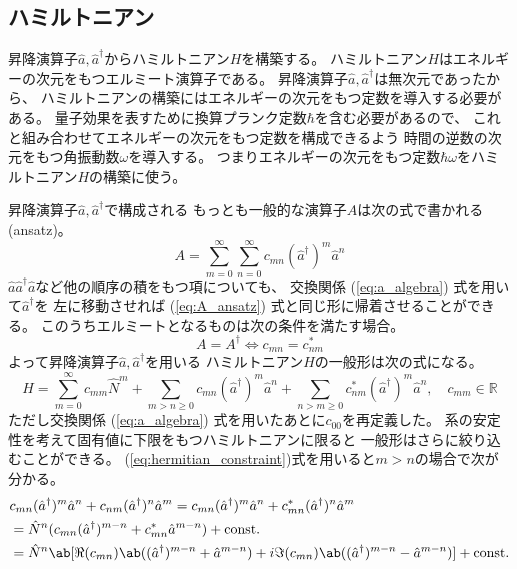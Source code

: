 
\subsection{ハミルトニアン}

昇降演算子$\hat{a},\hat{a}^\dagger$からハミルトニアン$H$を構築する。
ハミルトニアン$H$はエネルギーの次元をもつエルミート演算子である。
昇降演算子$\hat{a},\hat{a}^\dagger$は無次元であったから、
ハミルトニアンの構築にはエネルギーの次元をもつ定数を導入する必要がある。
量子効果を表すために換算プランク定数$\hbar$を含む必要があるので、
これと組み合わせてエネルギーの次元をもつ定数を構成できるよう
時間の逆数の次元をもつ角振動数$\omega$を導入する。
つまりエネルギーの次元をもつ定数$\hbar\omega$をハミルトニアン$H$の構築に使う。

昇降演算子$\hat{a},\hat{a}^\dagger$で構成される
もっとも一般的な演算子$A$は次の式で書かれる (ansatz)。
\begin{equation}
  \label{eq:A_ansatz}
  A=\sum_{m=0}^\infty\sum_{n=0}^\infty c_{mn}(\hat{a}^\dagger)^m\hat{a}^n
\end{equation}
$\hat{a}\hat{a}^\dagger\hat{a}$など他の順序の積をもつ項についても、
交換関係 (\ref{eq:a_algebra}) 式を用いて$\hat{a}^\dagger$を
左に移動させれば (\ref{eq:A_ansatz}) 式と同じ形に帰着させることができる。
このうちエルミートとなるものは次の条件を満たす場合。
\begin{equation}
  \label{eq:hermitian_constraint}
  A=A^\dagger
  \Leftrightarrow
  c_{mn} = c^\ast_{nm}
\end{equation}
よって昇降演算子$\hat{a},\hat{a}^\dagger$を用いる
ハミルトニアン$H$の一般形は次の式になる。
\begin{equation}
  \label{eq:H_ansatz}
  H=
  \sum_{m=0}^\infty c_{mm}\hat{N}^m
  +\sum_{m>n\geq0} c_{mn}(\hat{a}^\dagger)^m\hat{a}^n
  +\sum_{n>m\geq0} c^\ast_{nm}(\hat{a}^\dagger)^m\hat{a}^n,\quad
  c_{mm}\in\mathbb{R}
\end{equation}
ただし交換関係 (\ref{eq:a_algebra}) 式を用いたあとに$c_{00}$を再定義した。
系の安定性を考えて固有値に下限をもつハミルトニアンに限ると
一般形はさらに絞り込むことができる。
(\ref{eq:hermitian_constraint})式を用いると$m>n$の場合で次が分かる。
\begin{equation}
  \label{eq:hermitian_decomposite}
  \begin{split}
    &c_{mn}(\hat{a}^\dagger)^m\hat{a}^n
    + c_{nm}(\hat{a}^\dagger)^n\hat{a}^m
    =c_{mn}(\hat{a}^\dagger)^m\hat{a}^n
    + c^\ast_{mn}(\hat{a}^\dagger)^n\hat{a}^m \\
    &=\hat{N}^n
    (c_{mn}(\hat{a}^\dagger)^{m-n}+c^\ast_{mn}\hat{a}^{m-n})
    +\text{const.} \\
    &=\hat{N}^n
    \ab[
      \Re(c_{mn})\ab((\hat{a}^\dagger)^{m-n}+\hat{a}^{m-n})
      +i\Im(c_{mn})\ab((\hat{a}^\dagger)^{m-n}-\hat{a}^{m-n})
    ]+\text{const.}
  \end{split}
\end{equation}
